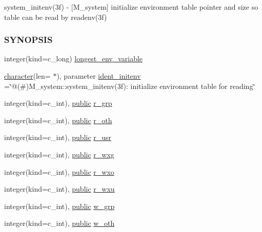 \begin{DoxyCompactItemize}
\begin{DoxyCompactList}
system\+\_\+initenv(3f) -\/ \mbox{[}M\+\_\+system\mbox{]} initialize environment table pointer and size so table can be read by readenv(3f) \subsubsection*{S\+Y\+N\+O\+P\+S\+IS}\end{DoxyCompactList}\item 
integer(kind=c\+\_\+long) \hyperlink{namespacem__system_ac066b6866f8ef4b8c358ec8daca7566c}{longest\+\_\+env\+\_\+variable}
\item 
\hyperlink{option__stopwatch_83_8txt_abd4b21fbbd175834027b5224bfe97e66}{character}(len= $\ast$), parameter \hyperlink{namespacem__system_a7246c40d96a190aabdd8a002c963c2d0}{ident\+\_\+initenv} =\char`\"{}@(\#)M\+\_\+system\+::system\+\_\+initenv(3f)\+: initialize environment table for reading\char`\"{}
\item 
integer(kind=c\+\_\+int), \hyperlink{M__stopwatch_83_8txt_a2f74811300c361e53b430611a7d1769f}{public} \hyperlink{namespacem__system_adb853ed1f9d39c45e0b512ab39c66605}{r\+\_\+grp}
\item 
integer(kind=c\+\_\+int), \hyperlink{M__stopwatch_83_8txt_a2f74811300c361e53b430611a7d1769f}{public} \hyperlink{namespacem__system_a74de84d2cb6b74e9d0d4c5aa5f1ba953}{r\+\_\+oth}
\item 
integer(kind=c\+\_\+int), \hyperlink{M__stopwatch_83_8txt_a2f74811300c361e53b430611a7d1769f}{public} \hyperlink{namespacem__system_ace7825dd19ed7191b37d3a7a27c75431}{r\+\_\+usr}
\item 
integer(kind=c\+\_\+int), \hyperlink{M__stopwatch_83_8txt_a2f74811300c361e53b430611a7d1769f}{public} \hyperlink{namespacem__system_a23aade9d4537c4260c2e44ef6a619db6}{r\+\_\+wxg}
\item 
integer(kind=c\+\_\+int), \hyperlink{M__stopwatch_83_8txt_a2f74811300c361e53b430611a7d1769f}{public} \hyperlink{namespacem__system_a9467bf0bb7ae96061314b865bde14f57}{r\+\_\+wxo}
\item 
integer(kind=c\+\_\+int), \hyperlink{M__stopwatch_83_8txt_a2f74811300c361e53b430611a7d1769f}{public} \hyperlink{namespacem__system_a10b9cc52ae68d1b64dd9f8ea4cfcd3be}{r\+\_\+wxu}
\item 
integer(kind=c\+\_\+int), \hyperlink{M__stopwatch_83_8txt_a2f74811300c361e53b430611a7d1769f}{public} \hyperlink{namespacem__system_ada5683bd408b30753f7565a1bb54b339}{w\+\_\+grp}
\item 
integer(kind=c\+\_\+int), \hyperlink{M__stopwatch_83_8txt_a2f74811300c361e53b430611a7d1769f}{public} \hyperlink{namespacem__system_a1801bba1e36a51345d442f73839c93d2}{w\+\_\+oth}

\end{DoxyCompactItemize}
